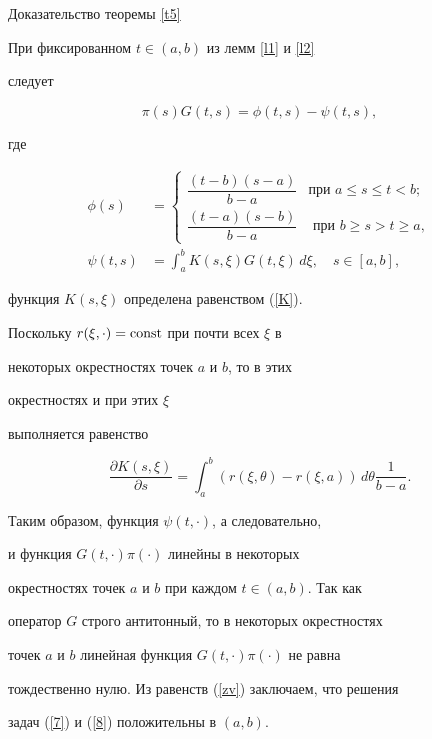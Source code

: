 \begin{pf*}{Доказательство теоремы \ref{t5}}





При фиксированном $t\in(a,b)$ из лемм \ref{l1} и \ref{l2}


следует


\begin{equation}\label{dzv}


\pi(s)G(t,s)=\phi(t,s)-\psi(t,s),


\end{equation}


где


\begin{align*}


\phi(s)&=


\begin{cases}


\dfrac{(t-b)(s-a)}{b-a}& \text{


при }a\le s\le t<b;\\


\dfrac{(t-a)(s-b)}{b-a}& \text{ при }


b\ge s>t\ge a,


\end{cases}


\\


\psi(t,s)&=


\int_a^bK(s,\xi)G(t,\xi)\,d\xi,\quad s\in[a,b],


\end{align*}


функция $K(s,\xi)$ определена равенством (\ref{K}).





Поскольку $r(\xi,\cdot)=\operatorname{const}$ при почти всех $\xi$ в


некоторых окрестностях точек $a$ и $b$, то в этих


окрестностях и при этих $\xi$


выполняется равенство


$$


\dfrac{\partial K(s,\xi)}{\partial


s}=\int_a^b(r(\xi,\theta)-r(\xi,a))\,d\theta\frac{1}{b-a}.


$$


Таким образом, функция $\psi(t,\cdot)$, а следовательно,


и функция $G(t,\cdot)\pi(\cdot)$ линейны в некоторых


окрестностях точек $a$ и $b$ при каждом $t\in(a,b)$. Так как


оператор $G$ строго антитонный, то в некоторых окрестностях


точек $a$ и $b$ линейная функция $G(t,\cdot)\pi(\cdot)$ не равна


тождественно нулю. Из равенств (\ref{zv}) заключаем, что решения


задач (\ref{7}) и (\ref{8}) положительны в $(a,b)$.


\end{pf*}





